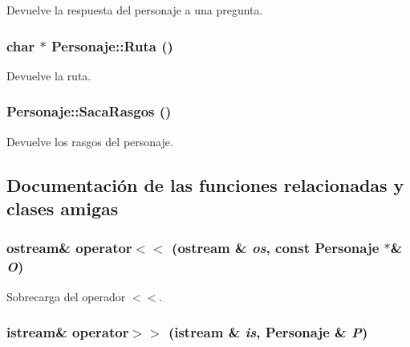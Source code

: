 Devuelve la respuesta del personaje a una pregunta. 

\hypertarget{class_personaje_97e98c33ff950a88922643931307a70b}{
\subsubsection[{Ruta}]{\setlength{\rightskip}{0pt plus 5cm}char $\ast$ Personaje::Ruta ()}}
\label{class_personaje_97e98c33ff950a88922643931307a70b}


Devuelve la ruta. 

\hypertarget{class_personaje_cfb48d84c94995523b450797e2c7a72f}{
\subsubsection[{SacaRasgos}]{ Personaje::SacaRasgos ()}}
\label{class_personaje_cfb48d84c94995523b450797e2c7a72f}


Devuelve los rasgos del personaje. 



\subsection{Documentación de las funciones relacionadas y clases amigas}
\hypertarget{class_personaje_5b0e555e2e3415573e9ab2d692150594}{
\subsubsection[{operator$<$$<$}]{\setlength{\rightskip}{0pt plus 5cm}ostream\& operator$<$$<$ (ostream \& {\em os}, \/  const {\bf Personaje} $\ast$\& {\em O})}}
\label{class_personaje_5b0e555e2e3415573e9ab2d692150594}


Sobrecarga del operador $<$$<$. 

\hypertarget{class_personaje_7cd04bde49bfa0ddbc0034d9358e34b0}{
\subsubsection[{operator$>$$>$}]{\setlength{\rightskip}{0pt plus 5cm}istream\& operator$>$$>$ (istream \& {\em is}, \/  {\bf Personaje} \& {\em P})}}
\label{class_personaje_7cd04bde49bfa0ddbc0034d9358e34b0}


